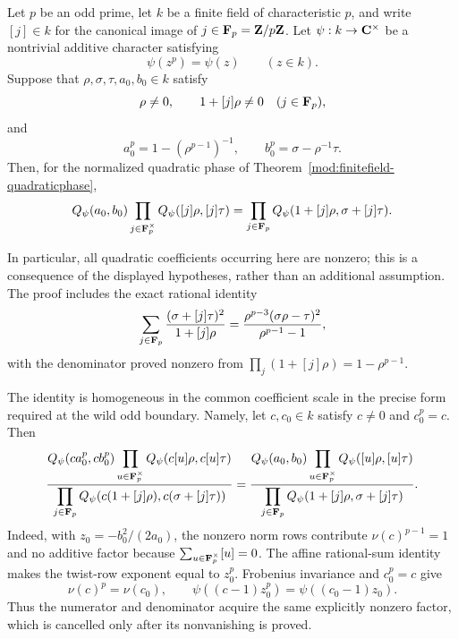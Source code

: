 \begin{theorem}\label{mod:finitefield-affinepencil}
Let $p$ be an odd prime, let $k$ be a finite field of characteristic
$p$, and write $[j]\in k$ for the canonical image of
$j\in\mathbf F_p=\mathbf Z/p\mathbf Z$.  Let $\psi:k\to\mathbf C^\times$ be a
nontrivial additive character satisfying
\[
  \psi(z^p)=\psi(z)\qquad(z\in k).
\]
Suppose that $\rho,\sigma,\tau,a_0,b_0\in k$ satisfy
\[
 \rho\ne0,\qquad 1+[j]\rho\ne0\quad(j\in\mathbf F_p),
\]
and
\[
 a_0^p=1-(\rho^{p-1})^{-1},
 \qquad b_0^p=\sigma-\rho^{-1}\tau.
\]
Then, for the normalized quadratic phase of
Theorem~\ref{mod:finitefield-quadraticphase},
\[
 Q_\psi(a_0,b_0)
 \prod_{j\in\mathbf F_p^\times}Q_\psi([j]\rho,[j]\tau)
 =\prod_{j\in\mathbf F_p}Q_\psi(1+[j]\rho,\sigma+[j]\tau).
\]

In particular, all quadratic coefficients occurring here are nonzero;
this is a consequence of the displayed hypotheses, rather than an
additional assumption.  The proof includes the exact rational identity
\[
 \sum_{j\in\mathbf F_p}\frac{(\sigma+[j]\tau)^2}{1+[j]\rho}
 =\frac{\rho^{p-3}(\sigma\rho-\tau)^2}{\rho^{p-1}-1},
\]
with the denominator proved nonzero from
$\prod_j(1+[j]\rho)=1-\rho^{p-1}$.

The identity is homogeneous in the common coefficient scale in the precise
form required at the wild odd boundary.  Namely, let $c,c_0\in k$ satisfy
$c\ne0$ and $c_0^p=c$.  Then
\[
 \frac{
   Q_\psi(ca_0^p,cb_0^p)
   \displaystyle\prod_{u\in\mathbf F_p^\times}
     Q_\psi(c[u]\rho,c[u]\tau)}{
   \displaystyle\prod_{j\in\mathbf F_p}
     Q_\psi(c(1+[j]\rho),c(\sigma+[j]\tau))}
 =
 \frac{
   Q_\psi(a_0,b_0)
   \displaystyle\prod_{u\in\mathbf F_p^\times}
     Q_\psi([u]\rho,[u]\tau)}{
   \displaystyle\prod_{j\in\mathbf F_p}
     Q_\psi(1+[j]\rho,\sigma+[j]\tau)}.
\]
Indeed, with $z_0=-b_0^2/(2a_0)$, the nonzero norm rows contribute
$\nu(c)^{p-1}=1$ and no additive factor because
$\sum_{u\in\mathbf F_p^\times}[u]=0$.  The affine rational-sum identity makes the
twist-row exponent equal to $z_0^p$.  Frobenius invariance and $c_0^p=c$
give
\[
 \nu(c)^p=\nu(c_0),\qquad
 \psi((c-1)z_0^p)=\psi((c_0-1)z_0).
\]
Thus the numerator and denominator acquire the same explicitly nonzero
factor, which is cancelled only after its nonvanishing is proved.
\leanok
{}
\end{theorem}
